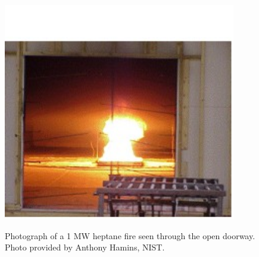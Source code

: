\begin{figure}[\figoptions{t}]
\begin{center}
\includegraphics[width=4.0in]{FIGURES/NIST_NRC/NISTNRC_1MW_fire}\\
\end{center}
\caption{Photograph of a 1 MW heptane fire seen through the open doorway. Photo provided by Anthony Hamins, NIST.}
 \label{fig:NISTNRC_1MW_fire}
\end{figure}

